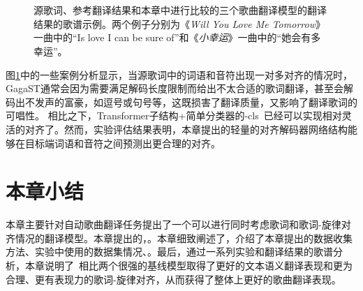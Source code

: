 \begin{figure}[htbp]
{}\\
\\
\caption{源歌词、参考翻译结果和本章中进行比较的三个歌曲翻译模型的翻译结果的歌谱示例。两个例子分别为《\textit{Will You Love Me Tomorrow}》一曲中的``Is love I can be sure of''和《\textit{小幸运}》一曲中的``她会有多幸运''。}
\label{fig:score_analysis}
\end{figure}
图\ref{fig:score_analysis}中的一些案例分析显示，当源歌词中的词语和音符出现一对多对齐的情况时，GagaST通常会因为需要满足解码长度限制而给出不太合适的歌词翻译，甚至会解码出不发声的富豪，如逗号或句号等，这既损害了翻译质量，又影响了翻译歌词的可唱性。
相比之下，Transformer子结构+简单分类器的\modelname-cls~已经可以实现相对灵活的对齐了。然而，实验评估结果表明，本章提出的轻量的对齐解码器网络结构能够在目标端词语和音符之间预测出更合理的对齐。
\section{本章小结}
本章主要针对自动歌曲翻译任务提出了一个可以进行同时考虑歌词和歌词-旋律对齐情况的翻译模型。本章提出的\modelname，。本章细致阐述了，介绍了本章提出的数据收集方法、实验中使用的数据集情况、。最后，通过一系列实验和翻译结果的歌谱分析，本章说明了\modelname~相比两个很强的基线模型取得了更好的文本语义翻译表现和更为合理、更有表现力的歌词-旋律对齐，从而获得了整体上更好的歌曲翻译表现。
